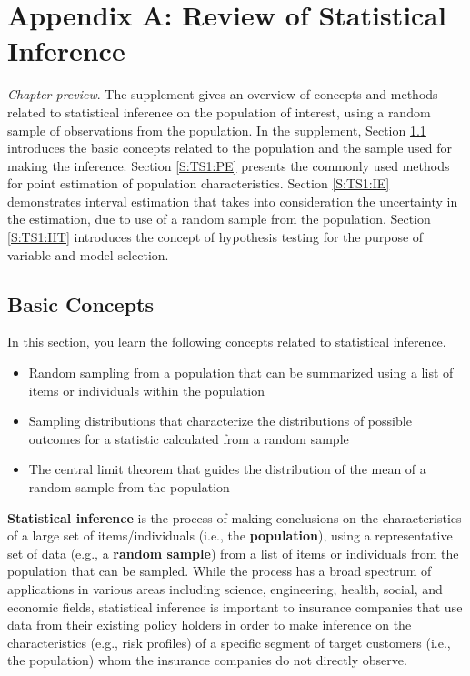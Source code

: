 \documentclass[]{book}
\providecommand{\tightlist}{%
  \setlength{\itemsep}{0pt}\setlength{\parskip}{0pt}}
\theoremstyle{definition}
\theoremstyle{definition}
\theoremstyle{definition}
\theoremstyle{remark}
\begin{document}
\chapter{Appendix A: Review of Statistical Inference}\label{C:TS1}

\emph{Chapter preview}. The supplement gives an overview of concepts and
methods related to statistical inference on the population of interest,
using a random sample of observations from the population. In the
supplement, Section \ref{S:TS1:BASIC} introduces the basic concepts
related to the population and the sample used for making the inference.
Section \ref{S:TS1:PE} presents the commonly used methods for point
estimation of population characteristics. Section \ref{S:TS1:IE}
demonstrates interval estimation that takes into consideration the
uncertainty in the estimation, due to use of a random sample from the
population. Section \ref{S:TS1:HT} introduces the concept of hypothesis
testing for the purpose of variable and model selection.

\section{Basic Concepts}\label{S:TS1:BASIC}

In this section, you learn the following concepts related to statistical
inference.

\begin{itemize}
\tightlist
\item
  Random sampling from a population that can be summarized using a list
  of items or individuals within the population
\item
  Sampling distributions that characterize the distributions of possible
  outcomes for a statistic calculated from a random sample
\item
  The central limit theorem that guides the distribution of the mean of
  a random sample from the population
\end{itemize}

\textbf{Statistical inference} is the process of making conclusions on
the characteristics of a large set of items/individuals (i.e., the
\textbf{population}), using a representative set of data (e.g., a
\textbf{random sample}) from a list of items or individuals from the
population that can be sampled. While the process has a broad spectrum
of applications in various areas including science, engineering, health,
social, and economic fields, statistical inference is important to
insurance companies that use data from their existing policy holders in
order to make inference on the characteristics (e.g., risk profiles) of
a specific segment of target customers (i.e., the population) whom the
insurance companies do not directly observe.
\end{document}
